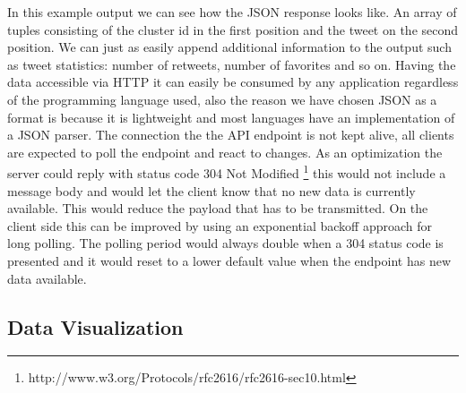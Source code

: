 In this example output we can see how the JSON response looks like. An array of tuples consisting of the cluster id in the first position and the tweet on the second position. We can just as easily append additional information to the output such as tweet statistics: number of retweets, number of favorites and so on.
\newline
Having the data accessible via HTTP it can easily be consumed by any application regardless of the programming language used, also the reason we have chosen JSON as a format is because it is lightweight and most languages have an implementation of a JSON parser. The connection the the API endpoint is not kept alive, all clients are expected to poll the endpoint and react to changes. As an optimization the server could reply with status code 304 Not Modified \footnote{http://www.w3.org/Protocols/rfc2616/rfc2616-sec10.html} this would not include a message body and would let the client know that no new data is currently available. This would reduce the payload that has to be transmitted. On the client side this can be improved by using an exponential backoff approach for long polling. The polling period would always double when a 304 status code is presented and it would reset to a lower default value when the endpoint has new data available.

\subsection{Data Visualization}
\label{datavisualization}

